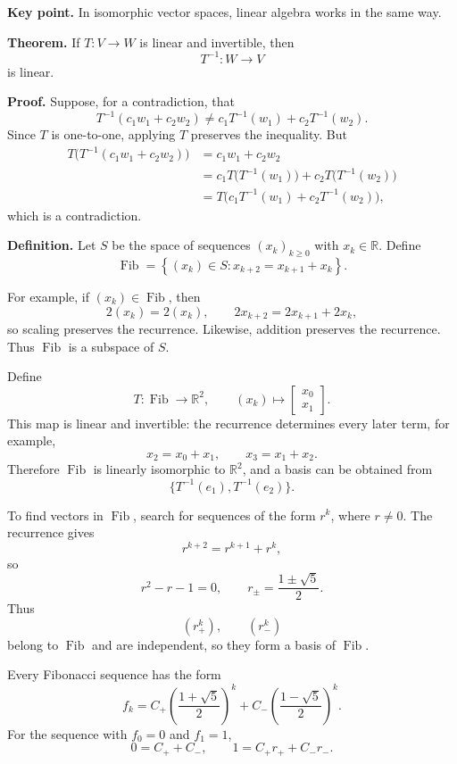 \documentclass[letterpaper]{article}
\begin{document}
\newpage

\textbf{Key point.} In isomorphic vector spaces, linear algebra works in the same way.

\medskip

\textbf{Theorem.} If $T:V\to W$ is linear and invertible, then
\[
T^{-1}:W\to V
\]
is linear.

\medskip

\textbf{Proof.} Suppose, for a contradiction, that
\[
T^{-1}(c_1w_1+c_2w_2)\ne c_1T^{-1}(w_1)+c_2T^{-1}(w_2).
\]
Since $T$ is one-to-one, applying $T$ preserves the inequality. But
\begin{align*}
T\bigl(T^{-1}(c_1w_1+c_2w_2)\bigr)
&=c_1w_1+c_2w_2\\
&=c_1T\bigl(T^{-1}(w_1)\bigr)+c_2T\bigl(T^{-1}(w_2)\bigr)\\
&=T\bigl(c_1T^{-1}(w_1)+c_2T^{-1}(w_2)\bigr),
\end{align*}
which is a contradiction.

\newpage

\textbf{Definition.} Let $S$ be the space of sequences $(x_k)_{k\geq0}$ with $x_k\in\mathbb{R}$. Define
\[
\operatorname{Fib}=
\left\{(x_k)\in S:x_{k+2}=x_{k+1}+x_k\right\}.
\]

\medskip

For example, if $(x_k)\in\operatorname{Fib}$, then
\[
2(x_k)=2(x_k),
\qquad
2x_{k+2}=2x_{k+1}+2x_k,
\]
so scaling preserves the recurrence. Likewise, addition preserves the recurrence. Thus $\operatorname{Fib}$ is a subspace of $S$.

\medskip

Define
\[
T:\operatorname{Fib}\to\mathbb{R}^2,
\qquad
(x_k)\longmapsto
\begin{bmatrix}x_0\\x_1\end{bmatrix}.
\]
This map is linear and invertible: the recurrence determines every later term, for example,
\[
x_2=x_0+x_1,
\qquad
x_3=x_1+x_2.
\]
Therefore $\operatorname{Fib}$ is linearly isomorphic to $\mathbb{R}^2$, and a basis can be obtained from
\[
\{T^{-1}(e_1),T^{-1}(e_2)\}.
\]

\newpage

To find vectors in $\operatorname{Fib}$, search for sequences of the form $r^k$, where $r\ne0$. The recurrence gives
\[
r^{k+2}=r^{k+1}+r^k,
\]
so
\[
r^2-r-1=0,
\qquad
r_{\pm}=\frac{1\pm\sqrt5}{2}.
\]
Thus
\[
(r_+^k),\qquad(r_-^k)
\]
belong to $\operatorname{Fib}$ and are independent, so they form a basis of $\operatorname{Fib}$.

\medskip

Every Fibonacci sequence has the form
\[
f_k=C_+\left(\frac{1+\sqrt5}{2}\right)^k
+C_-\left(\frac{1-\sqrt5}{2}\right)^k.
\]
For the sequence with $f_0=0$ and $f_1=1$,
\[
0=C_++C_-,
\qquad
1=C_+r_++C_-r_-.
\]
\end{document}
